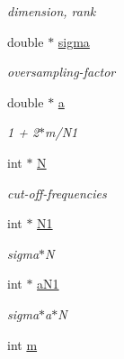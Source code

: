 \begin{CompactItemize}
\begin{CompactList}\small\item\em dimension, rank \item\end{CompactList}\item 
\hypertarget{structnnfft__plan_o5}{
double $\ast$ \hyperlink{structnnfft__plan_o5}{sigma}}
\label{structnnfft__plan_o5}

\begin{CompactList}\small\item\em oversampling-factor \item\end{CompactList}\item 
\hypertarget{structnnfft__plan_o6}{
double $\ast$ \hyperlink{structnnfft__plan_o6}{a}}
\label{structnnfft__plan_o6}

\begin{CompactList}\small\item\em 1 + 2$\ast$m/N1 \item\end{CompactList}\item 
\hypertarget{structnnfft__plan_o7}{
int $\ast$ \hyperlink{structnnfft__plan_o7}{N}}
\label{structnnfft__plan_o7}

\begin{CompactList}\small\item\em cut-off-frequencies \item\end{CompactList}\item 
\hypertarget{structnnfft__plan_o8}{
int $\ast$ \hyperlink{structnnfft__plan_o8}{N1}}
\label{structnnfft__plan_o8}

\begin{CompactList}\small\item\em sigma$\ast$N \item\end{CompactList}\item 
\hypertarget{structnnfft__plan_o9}{
int $\ast$ \hyperlink{structnnfft__plan_o9}{a\-N1}}
\label{structnnfft__plan_o9}

\begin{CompactList}\small\item\em sigma$\ast$a$\ast$N \item\end{CompactList}\item 
\hypertarget{structnnfft__plan_o10}{
int \hyperlink{structnnfft__plan_o10}{m}}
\label{structnnfft__plan_o10}


\end{CompactItemize}
